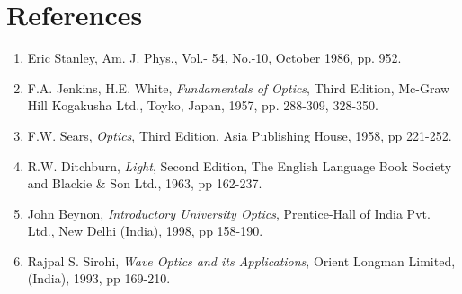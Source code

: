\section*{References}

\begin{enumerate}
\itemsep0em
    \item Eric Stanley, Am. J. Phys., Vol.- 54, No.-10, October 1986, pp. 952.
    \item F.A. Jenkins, H.E. White, \textit{Fundamentals of Optics}, Third Edition, Mc-Graw Hill Kogakusha Ltd., Toyko, Japan, 1957, pp. 288-309, 328-350.
    \item F.W. Sears, \textit{Optics}, Third Edition, Asia Publishing House, 1958, pp 221-252.
    \item R.W. Ditchburn, \textit{Light}, Second Edition, The English Language Book Society and Blackie \& Son Ltd., 1963, pp 162-237.
    \item John Beynon, \textit{Introductory University Optics}, Prentice-Hall of India Pvt. Ltd., New Delhi (India), 1998, pp 158-190.
    \item Rajpal S. Sirohi, \textit{Wave Optics and its Applications}, Orient Longman Limited, (India), 1993, pp 169-210.
\end{enumerate}



\newpage